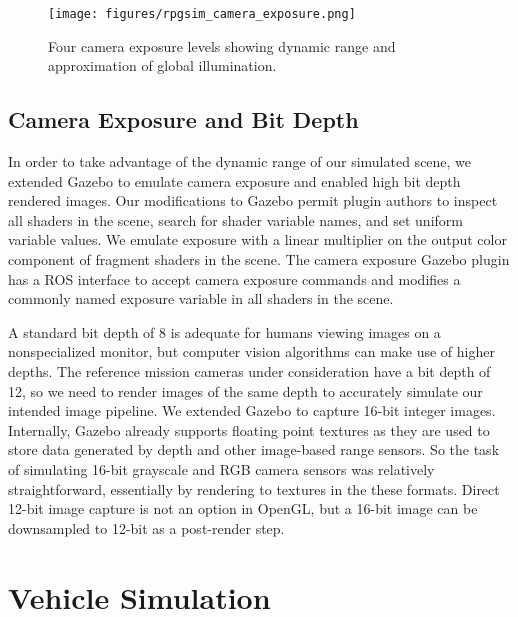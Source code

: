 \documentclass[twocolumn,letterpaper]{IEEEAerospaceCLS}  %
\begin{document}
\begin{figure}[h!]
  \texttt{[image: figures/rpgsim\_camera\_exposure.png]}
  \caption{Four camera exposure levels showing dynamic range and approximation of global illumination. }
  \label{fig:cameraexposure}
\end{figure}

\subsection{Camera Exposure and Bit Depth}
In order to take advantage of the dynamic range of our simulated scene, we extended Gazebo to emulate camera exposure and enabled high bit depth rendered images. 
Our modifications to Gazebo permit plugin authors to inspect all shaders in the scene, search for shader variable names, and set uniform variable values. 
We emulate exposure with a linear multiplier on the output color component of fragment shaders in the scene. 
The camera exposure Gazebo plugin has a ROS interface to accept camera exposure commands and modifies a commonly named exposure  variable in all shaders in the scene. 

A standard bit depth of 8 is adequate for humans viewing images on a nonspecialized monitor, but computer vision algorithms can make use of higher depths. 
The reference mission cameras under consideration have a bit depth of 12, so we need to render images of the same depth to accurately simulate our intended image pipeline. 
We extended Gazebo to capture 16-bit integer images. 
Internally, Gazebo already supports floating point textures as they are used to store data generated by depth and other image-based range sensors. So the task of simulating 16-bit grayscale and RGB camera sensors was relatively straightforward, essentially by rendering to textures in the these formats. 
Direct 12-bit image capture is not an option in OpenGL, but a 16-bit image can be downsampled to 12-bit as a post-render step.



\section{Vehicle Simulation}
\label{sec:vehicle-sim}
\end{document}
